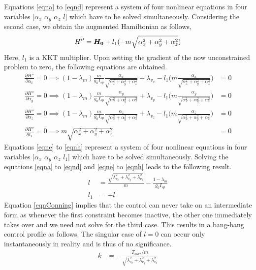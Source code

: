Equations \ref{eqna} to \ref{eqnd} represent a system of four nonlinear equations in four variables [$\alpha_x$ $\alpha_y$ $\alpha_z$ $l$] which have to be solved simultaneously.
Considering the second case, we obtain the augmented Hamiltonian as follows,
\begin{align}
\boldmath{H''}=\boldsymbol{H_0}+l_1(-m\sqrt{\alpha_x^2+\alpha_y^2+\alpha_z^2})
\end{align}
Here, $l_1$ is a KKT multiplier. Upon setting the gradient of the now unconstrained problem to zero, the following equations are obtained.
\begin{align}
\frac{\partial H''}{\partial \alpha_x}=0\implies(1-\lambda_m)\frac{m}{g_0 I_{sp}}\frac{\alpha_x}{\sqrt{\alpha_x^2+\alpha_y^2+\alpha_z^2}}+\lambda_{v_x}-l_1\bigg(m\frac{\alpha_x}{	\sqrt{\alpha_x^2+\alpha_y^2+\alpha_z^2}}\bigg)&=0\label{eqne}
\end{align}
\begin{align}
\frac{\partial H''}{\partial \alpha_y}=0\implies (1-\lambda_m)\frac{m}{g_0 I_{sp}}\frac{\alpha_y}{\sqrt{\alpha_x^2+\alpha_y^2+\alpha_z^2}}+\lambda_{v_y}-l_1\bigg(m\frac{\alpha_y}{	\sqrt{\alpha_x^2+\alpha_y^2+\alpha_z^2}}\bigg)&=0\label{eqnf}\\
\frac{\partial H''}{\partial \alpha_z}=0\implies(1-\lambda_m)\frac{m}{g_0 I_{sp}}\frac{\alpha_z}{\sqrt{\alpha_x^2+\alpha_y^2+\alpha_z^2}}+\lambda_{v_z}-l_1\bigg(m\frac{\alpha_z}{	\sqrt{\alpha_x^2+\alpha_y^2+\alpha_z^2}}\bigg)&=0\label{eqng}\\
\frac{\partial H''}{\partial l_1}=0\implies m\sqrt{\alpha_x^2+\alpha_y^2+\alpha_z^2}&=0\label{eqnh}
\end{align}
Equations \ref{eqne} to \ref{eqnh} represent a system of four nonlinear equations in four variables [$\alpha_x$ $\alpha_y$ $\alpha_z$ $l_1$] which have to be solved simultaneously. Solving the equations \ref{eqna} to \ref{eqnd} and \ref{eqne} to \ref{eqnh} leads to the following result. 
\begin{align}
	l&=\frac{\sqrt{\lambda_{v_x}^2+\lambda_{v_y}^2+\lambda_{v_z}^2}}{m}-\frac{1-\lambda_m}{g_0 I_{sp}}\\
	l_1&=-l\label{eqnConning}
\end{align}
Equation \ref{eqnConning} implies that the control can never take on an intermediate form as whenever the first constraint becomes inactive, the other one immediately takes over and we need not solve for the third case. This results in a bang-bang control profile as follows. The singular case of $l=0$ can occur only instantaneously in reality and is thus of no significance.
\begin{align}
	k&=-\frac{T_{max}/m}{\sqrt{\lambda_{v_x}^2+\lambda_{v_y}^2+\lambda_{v_z}^2}}
\end{align}


